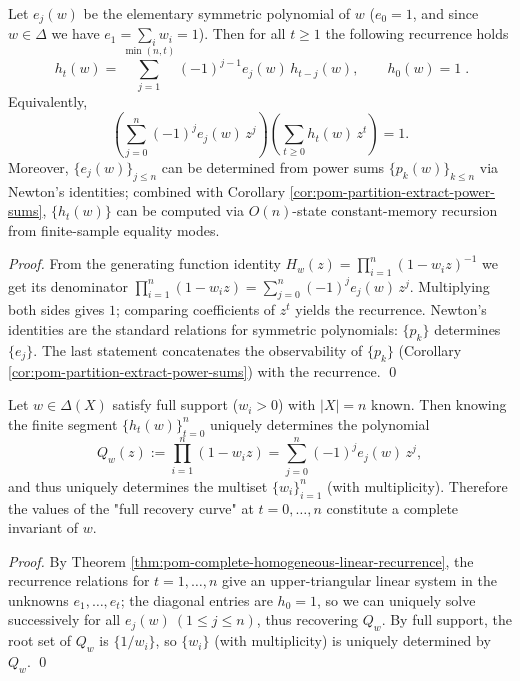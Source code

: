 \begin{theorem}\label{thm:pom-complete-homogeneous-linear-recurrence}
Let \(e_j(w)\) be the elementary symmetric polynomial of \(w\) (\(e_0=1\), and since \(w\in\Delta\) we have \(e_1=\sum_i w_i=1\)).
Then for all \(t\ge1\) the following recurrence holds
\[
\boxed{\;
h_t(w)=\sum_{j=1}^{\min(n,t)}(-1)^{j-1}e_j(w)\,h_{t-j}(w),\qquad h_0(w)=1\; }.
\]
Equivalently,
\[
\left(\sum_{j=0}^{n}(-1)^j e_j(w)\,z^j\right)\left(\sum_{t\ge0}h_t(w)\,z^t\right)=1.
\]
Moreover, \(\{e_j(w)\}_{j\le n}\) can be determined from power sums \(\{p_k(w)\}_{k\le n}\) via Newton's identities;
combined with Corollary \ref{cor:pom-partition-extract-power-sums}, \(\{h_t(w)\}\) can be computed via \(O(n)\)-state constant-memory recursion from finite-sample equality modes.
\end{theorem}
\begin{proof}
From the generating function identity
\(
H_w(z)=\prod_{i=1}^n(1-w_i z)^{-1}
\)
we get its denominator
\(
\prod_{i=1}^n(1-w_i z)=\sum_{j=0}^n(-1)^j e_j(w)\,z^j
\).
Multiplying both sides gives \(1\); comparing coefficients of \(z^t\) yields the recurrence.
Newton's identities are the standard relations for symmetric polynomials: \(\{p_k\}\) determines \(\{e_j\}\).
The last statement concatenates the observability of \(\{p_k\}\) (Corollary \ref{cor:pom-partition-extract-power-sums}) with the recurrence. \qed
\end{proof}

\begin{theorem}\label{thm:pom-invert-w-from-homogeneous-curve}
Let \(w\in\Delta(X)\) satisfy full support (\(w_i>0\)) with \(|X|=n\) known.
Then knowing the finite segment \(\{h_t(w)\}_{t=0}^{n}\) uniquely determines the polynomial
\[
Q_w(z):=\prod_{i=1}^n(1-w_i z)=\sum_{j=0}^n(-1)^j e_j(w)\,z^j,
\]
and thus uniquely determines the multiset \(\{w_i\}_{i=1}^n\) (with multiplicity).
Therefore the values of the "full recovery curve" at \(t=0,\dots,n\) constitute a complete invariant of \(w\).
\end{theorem}
\begin{proof}
By Theorem \ref{thm:pom-complete-homogeneous-linear-recurrence}, the recurrence relations for \(t=1,\dots,n\) give an upper-triangular linear system in the unknowns \(e_1,\dots,e_t\);
the diagonal entries are \(h_0=1\), so we can uniquely solve successively for all \(e_j(w)\ (1\le j\le n)\), thus recovering \(Q_w\).
By full support, the root set of \(Q_w\) is \(\{1/w_i\}\), so \(\{w_i\}\) (with multiplicity) is uniquely determined by \(Q_w\). \qed
\end{proof}

